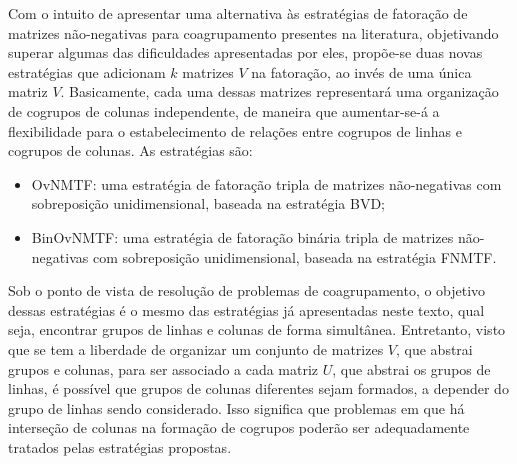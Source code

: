 \documentclass[
    12pt,                %
    oneside,            %
    a4paper,            %
    english,            %
    brazil                %
    ]{abntex2ppgsi}
\begin{document}
Com o intuito de apresentar uma alternativa às estratégias de fatoração de matrizes não-negativas para coagrupamento presentes na literatura, objetivando superar algumas das dificuldades apresentadas por eles, propõe-se duas novas estratégias que adicionam $k$ matrizes $V$ na fatoração, ao invés de uma única matriz $V$.
Basicamente, cada uma dessas matrizes representará uma organização de cogrupos de colunas independente, de maneira que aumentar-se-á a flexibilidade para o estabelecimento de relações entre cogrupos de linhas e cogrupos de colunas.
As estratégias são:

\begin{itemize}
\item OvNMTF: uma estratégia de fatoração tripla de matrizes não-negativas com sobreposição unidimensional, baseada na estratégia BVD;
\item BinOvNMTF: uma estratégia de fatoração binária tripla de matrizes não-negativas com sobreposição unidimensional, baseada na estratégia FNMTF.
\end{itemize}

Sob o ponto de vista de resolução de problemas de coagrupamento, o objetivo dessas estratégias é o mesmo das estratégias já apresentadas neste texto, qual seja, encontrar grupos de linhas e colunas de forma simultânea.
Entretanto, visto que se tem a liberdade de organizar um conjunto de matrizes $V$, que abstrai grupos e colunas, para ser associado a cada matriz $U$, que abstrai os grupos de linhas, é possível que grupos de colunas diferentes sejam formados, a depender do grupo de linhas sendo considerado.
Isso significa que problemas em que há interseção de colunas na formação de cogrupos poderão ser adequadamente tratados pelas estratégias propostas.
\end{document}
